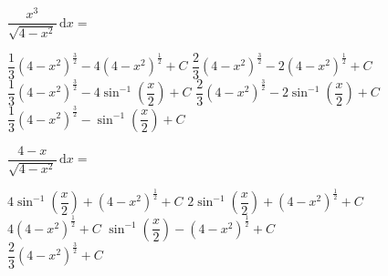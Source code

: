 \begin{questions}
    \question $\dfrac{x^3}{\sqrt{4 - x^2}} \,\mathrm{d}x = $ \\

    \begin{oneparchoices}
        \choice $\dfrac{1}{3}\left(4 - x^2\right)^{\frac{3}{2}} - 4\left(4 - x^2\right)^{\frac{1}{2}} + C$ 
        \choice $\dfrac{2}{3}\left(4 - x^2\right)^{\frac{3}{2}} - 2\left(4 - x^2\right)^{\frac{1}{2}} + C$ \\[11pt]
        \makebox[0.035\textwidth] \choice $\dfrac{1}{3}\left(4 - x^2\right)^{\frac{3}{2}} - 4\sin^{-1} \left(\dfrac{x}{2}\right) + C$
        \choice $\dfrac{2}{3}\left(4 - x^2\right)^{\frac{3}{2}} - 2\sin^{-1} \left(\dfrac{x}{2}\right) + C$ \\[11pt]
        \makebox[0.035\textwidth] \choice $\dfrac{1}{3}\left(4 - x^2\right)^{\frac{3}{2}} - \sin^{-1} \left(\dfrac{x}{2}\right) + C$
    \end{oneparchoices} \par \horizontalline

    \question $\dfrac{4 - x}{\sqrt{4 - x^2}} \,\mathrm{d}x = $ \\

    \begin{oneparchoices}
        \choice $4\sin^{-1} \left(\dfrac{x}{2}\right) + \left(4 - x^2\right)^{\frac{1}{2}} + C$
        \choice $2\sin^{-1} \left(\dfrac{x}{2}\right) + \left(4 - x^2\right)^{\frac{1}{2}} + C$ \\[11pt]
        \makebox[0.035\textwidth] \choice $4\left(4 - x^2\right)^{\frac{1}{2}} + C$
        \makebox[0.42\textwidth] \choice $\sin^{-1} \left(\dfrac{x}{2}\right) - \left(4 - x^2\right)^{\frac{1}{2}} + C$ \\[11pt]
        \makebox[0.035\textwidth] \choice $\dfrac{2}{3}\left(4 - x^2\right)^{\frac{3}{2}} + C$
    \end{oneparchoices} \par \horizontalline
\end{questions}
